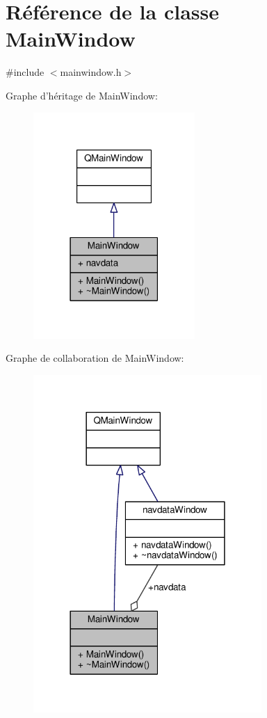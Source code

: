 \hypertarget{class_main_window}{\section{Référence de la classe Main\-Window}
\label{class_main_window}
}


{\ttfamily \#include $<$mainwindow.\-h$>$}



Graphe d'héritage de Main\-Window\-:
\nopagebreak
\begin{figure}[H]
\begin{center}
\leavevmode
\includegraphics[width=174pt]{class_main_window__inherit__graph}
\end{center}
\end{figure}


Graphe de collaboration de Main\-Window\-:
\nopagebreak
\begin{figure}[H]
\begin{center}
\leavevmode
\includegraphics[width=246pt]{class_main_window__coll__graph}
\end{center}
\end{figure}
